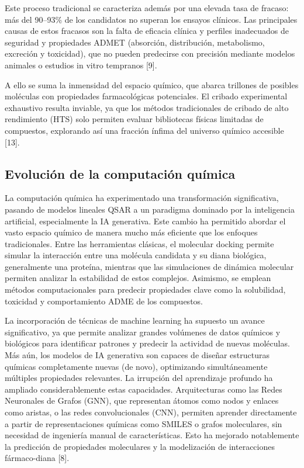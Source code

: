 \documentclass[IB]{TFUOC}%
\begin{document}
Este proceso tradicional se caracteriza además por una elevada tasa de fracaso: más del 90–93\% de los candidatos no superan los ensayos clínicos. Las principales causas de estos fracasos son la falta de eficacia clínica y perfiles inadecuados de seguridad y propiedades ADMET (absorción, distribución, metabolismo, excreción y toxicidad), que no pueden predecirse con precisión mediante modelos animales o estudios in vitro tempranos [9].

A ello se suma la inmensidad del espacio químico, que abarca trillones de posibles moléculas con propiedades farmacológicas potenciales. El cribado experimental exhaustivo resulta inviable, ya que los métodos tradicionales de cribado de alto rendimiento (HTS) solo permiten evaluar bibliotecas físicas limitadas de compuestos, explorando así una fracción ínfima del universo químico accesible [13].

\subsection{Evolución de la computación química}

La computación química ha experimentado una transformación significativa, pasando de modelos lineales QSAR a un paradigma dominado por la inteligencia artificial, especialmente la IA generativa. Este cambio ha permitido abordar el vasto espacio químico de manera mucho más eficiente que los enfoques tradicionales. Entre las herramientas clásicas, el molecular docking permite simular la interacción entre una molécula candidata y su diana biológica, generalmente una proteína, mientras que las simulaciones de dinámica molecular permiten analizar la estabilidad de estos complejos. Asimismo, se emplean métodos computacionales para predecir propiedades clave como la solubilidad, toxicidad y comportamiento ADME de los compuestos.

La incorporación de técnicas de machine learning ha supuesto un avance significativo, ya que permite analizar grandes volúmenes de datos químicos y biológicos para identificar patrones y predecir la actividad de nuevas moléculas. Más aún, los modelos de IA generativa son capaces de diseñar estructuras químicas completamente nuevas (de novo), optimizando simultáneamente múltiples propiedades relevantes.
La irrupción del aprendizaje profundo ha ampliado considerablemente estas capacidades. Arquitecturas como las Redes Neuronales de Grafos (GNN), que representan átomos como nodos y enlaces como aristas, o las redes convolucionales (CNN), permiten aprender directamente a partir de representaciones químicas como SMILES o grafos moleculares, sin necesidad de ingeniería manual de características. Esto ha mejorado notablemente la predicción de propiedades moleculares y la modelización de interacciones fármaco-diana [8].
\end{document}
